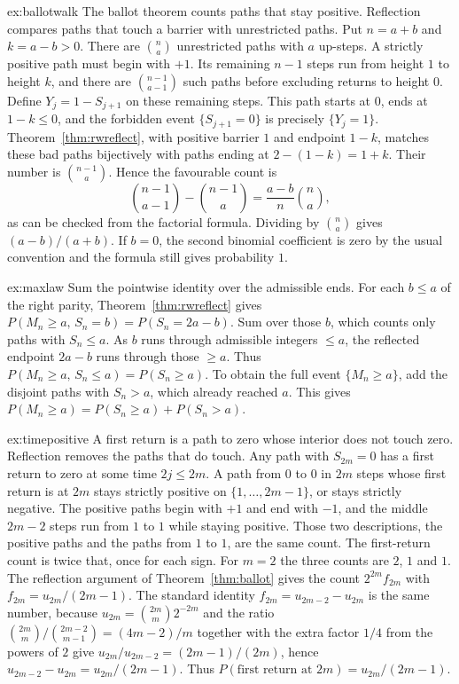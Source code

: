 \begin{solution}{ex:ballotwalk}
\idea The ballot theorem counts paths that stay positive. Reflection compares paths that touch a barrier with unrestricted paths.
\writeup Put $n=a+b$ and $k=a-b>0$. There are $\binom{n}{a}$ unrestricted paths with $a$ up-steps. A strictly positive path must begin with $+1$. Its remaining $n-1$ steps run from height $1$ to height $k$, and there are $\binom{n-1}{a-1}$ such paths before excluding returns to height $0$. Define $Y_j=1-S_{j+1}$ on these remaining steps. This path starts at $0$, ends at $1-k\le0$, and the forbidden event $\{S_{j+1}=0\}$ is precisely $\{Y_j=1\}$. Theorem~\ref{thm:rwreflect}, with positive barrier $1$ and endpoint $1-k$, matches these bad paths bijectively with paths ending at $2-(1-k)=1+k$. Their number is $\binom{n-1}{a}$. Hence the favourable count is
\[
\binom{n-1}{a-1}-\binom{n-1}{a}=\frac{a-b}{n}\binom na,
\]
as can be checked from the factorial formula. Dividing by $\binom na$ gives $(a-b)/(a+b)$. If $b=0$, the second binomial coefficient is zero by the usual convention and the formula still gives probability $1$.
\end{solution}

\begin{solution}{ex:maxlaw}
\idea Sum the pointwise identity over the admissible ends.
\writeup For each $b\le a$ of the right parity, Theorem~\ref{thm:rwreflect} gives $P(M_n\ge a,\,S_n=b)=P(S_n=2a-b)$. Sum over those $b$, which counts only paths with $S_n\le a$. As $b$ runs through admissible integers $\le a$, the reflected endpoint $2a-b$ runs through those $\ge a$. Thus $P(M_n\ge a,\,S_n\le a)=P(S_n\ge a)$. To obtain the full event $\{M_n\ge a\}$, add the disjoint paths with $S_n>a$, which already reached $a$. This gives $P(M_n\ge a)=P(S_n\ge a)+P(S_n>a)$.
\end{solution}

\begin{solution}{ex:timepositive}
\idea A first return is a path to zero whose interior does not touch zero. Reflection removes the paths that do touch.
\writeup Any path with $S_{2m}=0$ has a first return to zero at some time $2j\le 2m$. A path from $0$ to $0$ in $2m$ steps whose first return is at $2m$ stays strictly positive on $\{1,\ldots,2m-1\}$, or stays strictly negative. The positive paths begin with $+1$ and end with $-1$, and the middle $2m-2$ steps run from $1$ to $1$ while staying positive. Those two descriptions, the positive paths and the paths from $1$ to $1$, are the same count. The first-return count is twice that, once for each sign. For $m=2$ the three counts are $2$, $1$ and $1$. The reflection argument of Theorem~\ref{thm:ballot} gives the count $2^{2m}f_{2m}$ with $f_{2m}=u_{2m}/(2m-1)$. The standard identity $f_{2m}=u_{2m-2}-u_{2m}$ is the same number, because $u_{2m}=\binom{2m}{m}2^{-2m}$ and the ratio $\binom{2m}{m}/\binom{2m-2}{m-1}=(4m-2)/m$ together with the extra factor $1/4$ from the powers of $2$ give $u_{2m}/u_{2m-2}=(2m-1)/(2m)$, hence $u_{2m-2}-u_{2m}=u_{2m}/(2m-1)$. Thus $P(\text{first return at }2m)=u_{2m}/(2m-1)$.
\end{solution}

